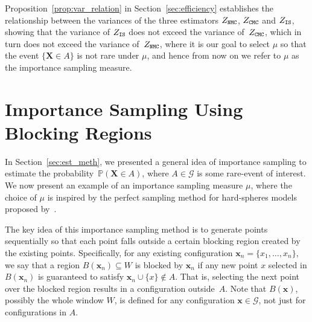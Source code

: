 \documentclass[pdflatex, sn-mathphys-ay]{sn-jnl}%
\newcommand{\mc}{\mathcal}
\renewcommand{\v}[1]{\boldsymbol{#1}}
\newcommand{\pp}{\mathbb{P}}
\newcommand{\cB}{B}
\newcommand{\mx}{\v{x}}
\newcommand{\mX}{\v{X}}
\newcommand{\scG}{\mathscr{G}}
\theoremstyle{thmstyleone}%
\theoremstyle{thmstyletwo}%
\theoremstyle{thmstylethree}%
\begin{document}
Proposition~\ref{prop:var_relation} in Section~\ref{sec:efficiency} establishes the relationship between the variances of the three estimators $Z_{\tt NMC}$, $Z_{\tt CMC}$ and $Z_{\tt IS}$, showing that the variance of $ Z_{\tt IS}$ does not exceed the variance of~$Z_{\tt CMC}$, which in turn does not exceed the variance of~$Z_{\tt NMC}$, where it is our goal  to select $\mu$ so that the event $\{\mX \in A\}$ is not rare under $\mu$, and hence from now on we refer to $\mu$ as the importance sampling measure. 

\section{Importance Sampling Using Blocking Regions}
\label{sec:is}
In Section~\ref{sec:est_meth}, we presented a general idea of importance sampling to estimate the probability~$\pp(\mX \in A)$, where $A \in  \mc G$ is some rare-event of interest. 
We now present an example of an importance sampling measure $\mu$, where the choice of  $\mu$ is inspired by the perfect sampling method for hard-spheres models proposed by~\cite{MJM17}. 

The key idea of this importance sampling method is to generate points sequentially so that each point falls 
outside a certain blocking region created by the existing points. 
Specifically, for any existing configuration ${\mx_n = \{x_1, \dots, x_n\}}$, 
we say that a region ${\cB(\mx_n) \subseteq W}$ is blocked by $\mx_n$ if any  new point $x$ 
selected in $\cB(\mx_n)$ is guaranteed to satisfy ${\mx_n \cup \{x\} \notin A }$.
That is, selecting the next point over the blocked region results in a configuration outside~$A$. 
Note that $B(\mx)$, possibly the whole window $W$, is defined for any configuration $\mx \in \scG$, not just for configurations in $A$.
\end{document}
